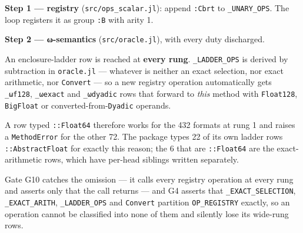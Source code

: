 \textbf{Step 1 — registry} (\texttt{src/ops\_\allowbreak{}scalar.jl}): append \texttt{:Cbrt} to \texttt{\_\allowbreak{}UNARY\_\allowbreak{}OPS}. The loop registers it as group \texttt{:B} with arity 1.



\textbf{Step 2 — ω-semantics} (\texttt{src/oracle.jl}), with every duty discharged.



\begin{tcolorbox}[toptitle=-1mm,bottomtitle=1mm,colback=admonition-warning!50!white,colframe=admonition-warning,title=\textbf{Type the row `::AbstractFloat`, not `::Float64`}]
An enclosure-ladder row is reached at \textbf{every rung}. \texttt{\_\allowbreak{}LADDER\_\allowbreak{}OPS} is derived by subtraction in \texttt{oracle.jl} — whatever is neither an exact selection, nor exact arithmetic, nor \texttt{Convert} — so a new registry operation automatically gets \texttt{\_\allowbreak{}ωf128}, \texttt{\_\allowbreak{}ωexact} and \texttt{\_\allowbreak{}ωdyadic} rows that forward to \emph{this} method with \texttt{Float128}, \texttt{BigFloat} or converted-from-\texttt{Dyadic} operands.

A row typed \texttt{::Float64} therefore works for the 432 formats at rung 1 and raises a \texttt{MethodError} for the other 72. The package types 22 of its own ladder rows \texttt{::AbstractFloat} for exactly this reason; the 6 that are \texttt{::Float64} are the exact-arithmetic rows, which have per-head siblings written separately.

Gate G10 catches the omission — it calls every registry operation at every rung and asserts only that the call returns — and G4 asserts that \texttt{\_\allowbreak{}EXACT\_\allowbreak{}SELECTION}, \texttt{\_\allowbreak{}EXACT\_\allowbreak{}ARITH}, \texttt{\_\allowbreak{}LADDER\_\allowbreak{}OPS} and \texttt{Convert} partition \texttt{OP\_\allowbreak{}REGISTRY} exactly, so an operation cannot be classified into none of them and silently lose its wide-rung rows.

\end{tcolorbox}



